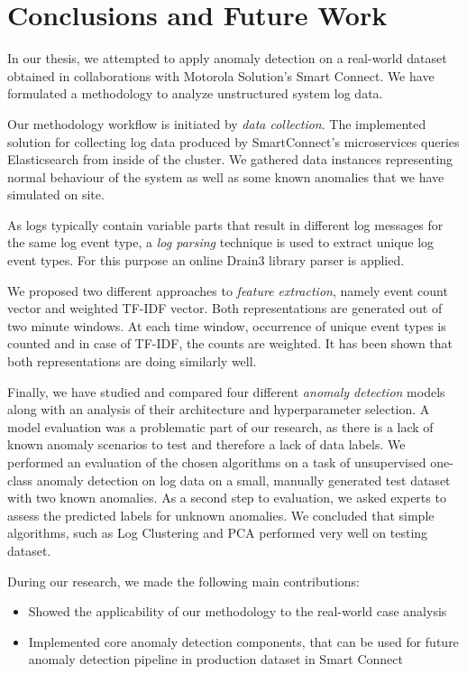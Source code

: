 \chapter{Conclusions and Future Work}
\label{conclusion}
In our thesis, we attempted to apply anomaly detection on a real-world dataset obtained in collaborations with Motorola Solution's Smart Connect. We have formulated a methodology to analyze unstructured system log data. 

Our methodology workflow is initiated by \textit{data collection}. The implemented solution for collecting log data produced by SmartConnect's microservices queries Elasticsearch from inside of the cluster. We gathered data instances representing normal behaviour of the system as well as some known anomalies that we have simulated on site.

As logs typically contain variable parts that result in different log messages for the same log event type, a \textit{log parsing} technique is used to extract unique log event types. For this purpose an online Drain3 library parser is applied. 

We proposed two different approaches to \textit{feature extraction}, namely event count vector and weighted TF-IDF vector. Both representations are generated out of two minute windows. At each time window, occurrence of unique event types is counted and in case of TF-IDF, the counts are weighted. It has been shown that both representations are doing similarly well.

Finally, we have studied and compared four different \textit{anomaly detection} models along with an analysis of their architecture and hyperparameter selection. A model evaluation was a problematic part of our research, as there is a lack of known anomaly scenarios to test and therefore a lack of data labels. We performed an evaluation of the chosen algorithms on a task of unsupervised one-class anomaly detection on log data on a small, manually generated test dataset with two known anomalies. As a second step to evaluation, we asked experts to assess the predicted labels for unknown anomalies. We concluded that simple algorithms, such as Log Clustering and PCA performed very well on testing dataset.

During our research, we made the following main contributions:

\begin{itemize}
    \item Showed the applicability of our methodology to the real-world case analysis
    \item Implemented core anomaly detection components, that can be used for future anomaly detection pipeline in production dataset in Smart Connect
\end{itemize}

